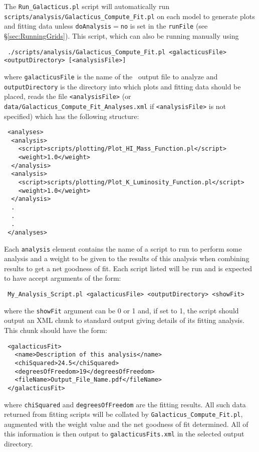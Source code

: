 The {\tt Run\_Galacticus.pl} script will automatically run {\tt scripts/analysis/Galacticus\_Compute\_Fit.pl} on each model to generate plots and fitting data unless {\tt doAnalysis}$=${\tt no} is set in the {\tt runFile} (see \S\ref{sec:RunningGrids}). This script, which can also be running manually using
\begin{verbatim}
 ./scripts/analysis/Galacticus_Compute_Fit.pl <galacticusFile> <outputDirectory> [<analysisFile>]
\end{verbatim}
where {\tt galacticusFile} is the name of the \glc\ output file to analyze and {\tt outputDirectory} is the directory into which plots and fitting data should be placed, reads the file {\tt \textless analysisFile\textgreater} (or {\tt data/Galacticus\_Compute\_Fit\_Analyses.xml} if {\tt \textless analysisFile\textgreater} is not specified) which has the following structure:
\begin{verbatim}
 <analyses>
  <analysis>
    <script>scripts/plotting/Plot_HI_Mass_Function.pl</script>
    <weight>1.0</weight>
  </analysis>
  <analysis>
    <script>scripts/plotting/Plot_K_Luminosity_Function.pl</script>
    <weight>1.0</weight>
  </analysis>
  .
  .
  .
 </analyses>
\end{verbatim}
Each {\tt analysis} element contains the name of a script to run to perform some analysis and a weight to be given to the results of this analysis when combining results to get a net goodness of fit. Each script listed will be run and is expected to have accept arguments of the form:
\begin{verbatim}
 My_Analysis_Script.pl <galacticusFile> <outputDirectory> <showFit>
\end{verbatim}
where the {\tt showFit} argument can be 0 or 1 and, if set to 1, the script should output an XML chunk to standard output giving details of its fitting analysis. This chunk should have the form:
\begin{verbatim}
 <galacticusFit>
   <name>Description of this analysis</name>
   <chiSquared>24.5</chiSquared>
   <degreesOfFreedom>19</degreesOfFreedom>
   <fileName>Output_File_Name.pdf</fileName>
 </galacticusFit>
\end{verbatim}
where {\tt chiSquared} and {\tt degreesOfFreedom} are the fitting results. All such data returned from fitting scripts will be collated by {\tt Galacticus\_Compute\_Fit.pl}, augmented with the weight value and the net goodness of fit determined. All of this information is then output to {\tt galacticusFits.xml} in the selected output directory.

